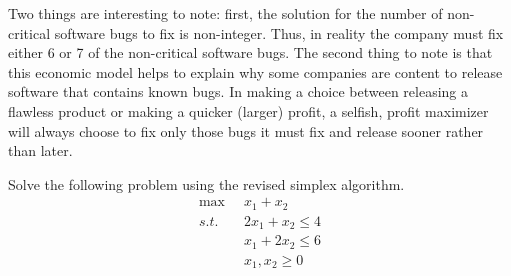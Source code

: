 \begin{example}
Two things are interesting to note: first, the solution for the number of non-critical software bugs to fix is non-integer. Thus, in reality the company must fix either 6 or 7 of the non-critical software bugs. The second thing to note is that this economic model helps to explain why some companies are content to release software that contains known bugs. In making a choice between releasing a flawless product or making a quicker (larger) profit, a selfish, profit maximizer will always choose to fix only those bugs it must fix and release sooner rather than later. 
\end{example}

\begin{exercise} Solve the following problem using the revised simplex algorithm.
\begin{displaymath}
\begin{aligned}
\max\;\;&x_1 + x_2\\
s.t.\;\;&2x_1 + x_2 \leq 4\\
&x_1 + 2x_2 \leq 6\\
&x_1, x_2 \geq 0
\end{aligned}
\end{displaymath}
\label{exer:RevisedSimplex}
\end{exercise}

